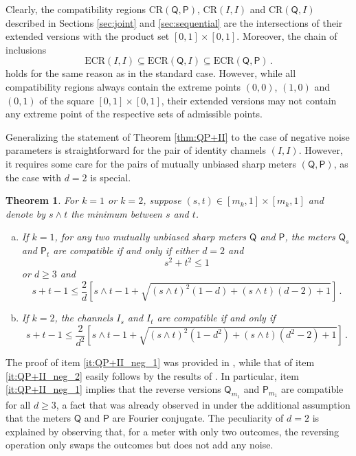 \documentclass[12pt,reqno]{amsart}
\newtheorem{theorem}{Theorem}
\theoremstyle{definition}
\newcommand{\Qo}{\mathsf{Q}}%
\newcommand{\Po}{\mathsf{P}}%
\newcommand{\CR}[1]{\textrm{CR} #1} %
\newcommand{\ECR}[1]{\textrm{ECR} #1} %
\begin{document}
Clearly, the compatibility regions $\CR{(\Qo,\Po)}$, $\CR{(I,I)}$ and $\CR{(\Qo,I)}$ described in Sections \ref{sec:joint} and \ref{sec:sequential} are the intersections of their extended versions with the product set $[0,1]\times [0,1]$. Moreover, the chain of inclusions
\begin{equation} %
\ECR{(I,I)}\subseteq\ECR{(\Qo,I)}\subseteq\ECR{(\Qo,\Po)}\,.
\end{equation}
holds for the same reason as in the standard case. 
However, while all compatibility regions always contain the extreme points $(0,0)$, $(1,0)$ and $(0,1)$ of the square $[0,1]\times [0,1]$, their extended versions may not contain any extreme point of the respective sets of admissible points.

Generalizing the statement of Theorem \ref{thm:QP+II} to the case of negative noise parameters is straightforward for the pair of identity channels $(I,I)$. However, it requires some care for the pairs of mutually unbiased sharp meters $(\Qo,\Po)$, as the case with $d=2$ is special.

\begin{theorem}\label{thm:QP+II_neg}
For $k=1$ or $k=2$, suppose $(s,t)\in [m_k,1]\times [m_k,1]$ and denote by $s\wedge t$ the minimum between $s$ and $t$.
\begin{enumerate}[(a)]
\item If $k=1$, for any two mutually unbiased sharp meters $\Qo$ and $\Po$, the meters $\Qo_s$ and $\Po_t$ are compatible if and only if either $d=2$ and\label{it:QP+II_neg_1}
\begin{equation}\label{eq:QP_comp_neg_1}
s^2+t^2\leq 1
\end{equation}
or $d\geq 3$ and
\begin{equation}\label{eq:QP_comp_neg_2}
s+t-1\leq \frac{2}{d}\left[s\wedge t - 1 + \sqrt{(s\wedge t)^2(1-d) + (s\wedge t)(d-2) + 1}\right]\,.
\end{equation}
\item If $k=2$, the channels $I_s$ and $I_t$ are compatible if and only if\label{it:QP+II_neg_2}
\begin{equation}\label{eq:II_comp_neg}
s+t-1\leq \frac{2}{d^2}\left[s\wedge t - 1 + \sqrt{(s\wedge t)^2(1-d^2) + (s\wedge t)(d^2-2) + 1}\right]\,.
\end{equation}
\end{enumerate}
\end{theorem}
The proof of item \eqref{it:QP+II_neg_1} was provided in \cite{CaHeTo19,CaCaTo19}, while that of item \eqref{it:QP+II_neg_2} easily follows by the results of \cite{Hashagen17}. In particular, item \eqref{it:QP+II_neg_1} implies that the reverse versions $\Qo_{m_1}$ and $\Po_{m_1}$ are compatible for all $d\geq 3$, a fact that was already observed in \cite{FiHeLe17} under the additional assumption that the meters $\Qo$ and $\Po$ are Fourier conjugate. The peculiarity of $d=2$ is explained by observing that, for a meter with only two outcomes, the reversing operation only swaps the outcomes but does not add any noise.
\end{document}
